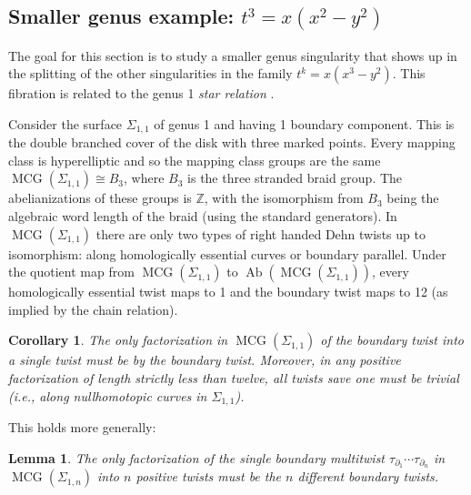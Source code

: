 \documentclass[11pt,letterpaper,reqno]{amsart}
\newtheorem{lemma}[theorem]{Lemma}
\newtheorem{corollary}[theorem]{Corollary}
\theoremstyle{remark}
\newcommand{\ZZ}{{\mathbb Z}}
\DeclareMathOperator{\MCG}{MCG}
\DeclareMathOperator{\Ab}{Ab}
\begin{document}
\subsection*{Smaller genus example: \texorpdfstring{{\boldmath $t^3 = x(x^2-y^2)$}}{psi0}} \label{sec:psi0}
The goal for this section is to study a smaller genus singularity that shows up in the splitting of the other singularities in the family $t^k = x(x^3-y^2)$. This fibration is related to the genus 1 \emph{star relation} \cite{Gervais}.



\noindent Consider the surface $\Sigma_{1,1}$ of genus 1 and having 1 boundary component. This is the double branched cover of the disk with three marked points. Every mapping class is hyperelliptic and so the mapping class groups are the same $\MCG(\Sigma_{1,1}) \cong B_3$, where $B_3$ is the three stranded braid group. The abelianizations of these groups is $\ZZ$, with the isomorphism from $B_3$ being the algebraic word length of the braid (using the standard generators). In $\MCG(\Sigma_{1,1})$ there are only two types of right handed Dehn twists up to isomorphism: along homologically essential curves or boundary parallel. Under the quotient map from $\MCG(\Sigma_{1,1})$ to $\Ab(\MCG(\Sigma_{1,1}))$, every homologically essential twist maps to 1 and the boundary twist maps to 12 (as implied by the chain relation).

\begin{corollary} The only factorization in $\MCG(\Sigma_{1,1})$ of the boundary twist into a single twist must be by the boundary twist. Moreover, in any positive factorization of length strictly less than twelve, all twists save one must be trivial (i.e., along nullhomotopic curves in $\Sigma_{1,1}$). 
\end{corollary}

This holds more generally:

\begin{lemma} The only factorization of the single boundary multitwist $\tau_{\partial_1} \cdots \tau_{\partial_n}$ in $\MCG(\Sigma_{1,n})$ into $n$ positive twists must be the $n$ different boundary twists. 
\end{lemma}
\end{document}
